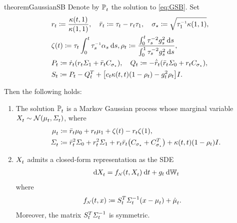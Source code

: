 \begin{restatable}{theorem}{GaussianSB}
\label{thm:gaussian_sb}
Denote by $\mathbb{P}^{}_{ t }$ the solution to  \eqref{eq:GSB}. Set 
\begin{align}
\nn
&\ratio \defeq \frac{\kernel[\ctime][\horizon]  }{ \kernel[\horizon][\horizon]},\quad \ratioc \defeq \aggtime - \ratio \aggtime[\horizon],\quad \sigma_\star \defeq \sqrt{ \aggtimeinv[\horizon]\kernel[\horizon][\horizon]}, \\ 
\nn
&\tshift \defeq \aggtime\int_0^\ctime \aggtimeinv\shift[\ctimealt]\dd \ctimealt, \efftr \defeq \frac{\intdasq}{\intdasqT}, \\
\nn
&P_\ctime \defeq \dratio\parens*{\ratio \covaralt + \ratioc C_{\sigma_\star}}, \quad Q_\ctime \defeq -\dratioc\parens*{\ratioc\covar + \ratio C_{\sigma_\star}}, 
\\ 
&S_\ctime \defeq P_\ctime -  Q_\ctime^T  + \bracks*{ \drift \kernel[\ctime][\ctime] \parens*{ 1- \efftr }  -  \volatsq[\ctime] \efftr  }\eye.
\label{eq:functions}
\end{align} 

Then the following holds:
\begin{enumerate}[leftmargin=.5cm,itemsep=.01cm,topsep=0cm]
\item The solution $\mathbb{P}^{}_{ t }$ is a Markov Gaussian process whose marginal variable $\Xsol \sim\Ncal\parens*{\meansol,\Sigmasol}$, where
\begin{align}
\label{eq:meansol}
\meansol &\defeq \ratioc \m + \ratio \malt + \tshift - \ratio \tshift[\horizon], \\
\label{eq:covsol}
\Sigmasol&\defeq \ratioc^2\covar + \ratio^2 \covaralt + \ratio\ratioc \parens*{ C_{\sigma_\star} + C_{\sigma_\star}^T  } +  \kernel[\ctime][\ctime]  \parens*{ 1- \efftr } \eye.
\end{align} %
\item $X^{}_{ t }$ admits a closed-form representation as the \acrshort{SDE}
\begin{align}
\label{eq:GSB-forward-sol}
\dXsol = \GSBf[\ctime][\Xsol] \dd \ctime + \volat\dWiener[\ctime]
\end{align}where 
\begin{align}
\label{eq:GSB-forward}
\GSBf &\defeq \St^T \Sigmasolinv\parens*{\point - \meansol} + \dmeansol.
\end{align}Moreover, the matrix $S_t^T \Sigma^{-1}_{ t }$ is symmetric.
\end{enumerate}
\end{restatable}

